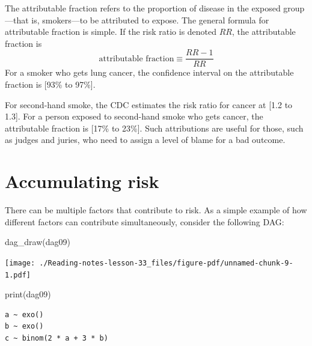 \documentclass[
  letterpaper,
  DIV=11,
  numbers=noendperiod,
  oneside]{scrreprt}
\newenvironment{Shaded}{\begin{snugshade}}{\end{snugshade}}
\newcommand{\FunctionTok}[1]{\textcolor[rgb]{0.28,0.35,0.67}{#1}}
\newcommand{\NormalTok}[1]{\textcolor[rgb]{0.00,0.23,0.31}{#1}}
\begin{document}
{\begin{footnotesize}
\begin{tcolorbox}
The attributable fraction refers to the proportion of disease in the
exposed group---that is, smokers---to be attributed to expose. The
general formula for attributable fraction is simple. If the risk ratio
is denoted \(RR\), the attributable fraction is
\[\text{attributable fraction} \equiv \frac{RR-1}{RR}\] For a smoker who
gets lung cancer, the confidence interval on the attributable fraction
is {[}93\% to 97\%{]}.

For second-hand smoke, the CDC estimates the risk ratio for cancer at
{[}1.2 to 1.3{]}. For a person exposed to second-hand smoke who gets
cancer, the attributable fraction is {[}17\% to 23\%{]}. Such
attributions are useful for those, such as judges and juries, who need
to assign a level of blame for a bad outcome.

\end{tcolorbox}

\hypertarget{accumulating-risk}{%
\section{Accumulating risk}\label{accumulating-risk}}

There can be multiple factors that contribute to risk. As a simple
example of how different factors can contribute simultaneously, consider
the following DAG:

\begin{Shaded}
\begin{Highlighting}[]
\FunctionTok{dag\_draw}\NormalTok{(dag09)}
\end{Highlighting}
\end{Shaded}

\begin{marginfigure}

{\centering \texttt{[image: ./Reading-notes-lesson-33\_files/figure-pdf/unnamed-chunk-9-1.pdf]}

}

\end{marginfigure}

\begin{Shaded}
\begin{Highlighting}[]
\FunctionTok{print}\NormalTok{(dag09)}
\end{Highlighting}
\end{Shaded}

\begin{verbatim}
a ~ exo()
b ~ exo()
c ~ binom(2 * a + 3 * b)
\end{verbatim}


\end{footnotesize}}
\end{document}
